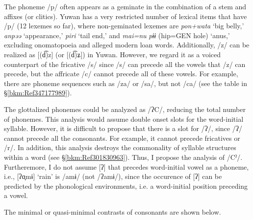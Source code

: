 The phoneme /p/ often appears as a geminate in the combination of a stem and affixes (or clitics). Yuwan has a very restricted number of lexical items that have /p/ (12 lexemes so far), where non-geminated lexemes are \textit{pon+wata} ‘big belly,’ \textit{anpəə} ‘appearance,’ \textit{piri} ‘tail end,’ and \textit{mai=nu} \textit{pɨɨ} (hip=GEN hole) ‘anus,’ excluding onomatopoeia and alleged modern loan words. Additionally, /z/ can be realized as [(d͡)z] (or [(d͡)ʑ]) in Yuwan. However, we regard it as a voiced counterpart of the fricative /s/ since /s/ can precede all the vowels that /z/ can precede, but the affricate /c/ cannot precede all of these vowels. For example, there are phoneme sequences such as /za/ or /sa/, but not /ca/ (see the table in §\ref{bkm:Ref347177989}).

The glottalized phonemes could be analyzed as /ʔC/, reducing the total number of phonemes. This analysis would assume double onset slots for the word-initial syllable. However, it is difficult to propose that there is a slot for /ʔ/, since /ʔ/ cannot precede all the consonants. For example, it cannot precede fricatives or /r/. In addition, this analysis destroys the commonality of syllable structures within a word (see §\ref{bkm:Ref301830963}). Thus, I propose the analysis of /Cˀ/. Furtheremore, I do not assume [ʔ] that precedes word-initial vowel as a phoneme, i.e., [ʔɑ̟mɨ] ‘rain’ is /amɨ/ (not /ʔamɨ/), since the occurence of [ʔ] can be predicted by the phonological environments, i.e. a word-initial position preceding a vowel.

The minimal or quasi-minimal contrasts of consonants are shown below.

